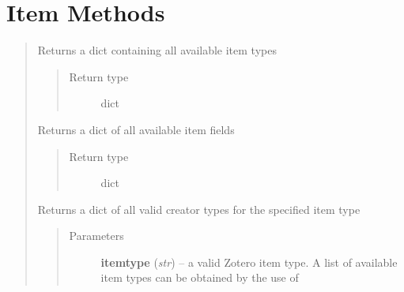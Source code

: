 \documentclass[letterpaper,10pt,english]{sphinxmanual}
\begin{document}
\section{Item Methods}
\label{index:item-methods}\begin{quote}

\begin{fulllineitems}
\label{index:pyzotero.zotero.Zotero.item_types}
Returns a dict containing all available item types
\begin{quote}\begin{description}
\item[{Return type}] \leavevmode
dict

\end{description}\end{quote}

\end{fulllineitems}


\begin{fulllineitems}
\label{index:pyzotero.zotero.Zotero.item_fields}
Returns a dict of all available item fields
\begin{quote}\begin{description}
\item[{Return type}] \leavevmode
dict

\end{description}\end{quote}

\end{fulllineitems}


\begin{fulllineitems}
\label{index:pyzotero.zotero.Zotero.item_creator_types}
Returns a dict of all valid creator types for the specified item type
\begin{quote}\begin{description}
\item[{Parameters}] \leavevmode
\textbf{itemtype} (\emph{str}) -- a valid Zotero item type. A list of available item types can be obtained by the use of {\hyperref[index:pyzotero.zotero.Zotero.item_types]{}}


\end{description}
\end{quote}
\end{fulllineitems}
\end{quote}
\end{document}
